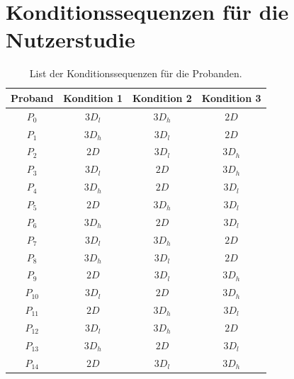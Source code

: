 \chapter{Konditionssequenzen für die Nutzerstudie}
\begin{table}[h]
    \centering
    \caption{List der Konditionssequenzen für die Probanden.}
    \label{appendix:condition_sequences}
    \begin{tabular}{cccc}\toprule
        Proband & Kondition 1 & Kondition 2 & Kondition 3 \\\midrule
        $P_0$ & $3D_l$ & $3D_h$ & $2D$ \\
        $P_1$ & $3D_h$ & $3D_l$ & $2D$ \\
        $P_2$ & $2D$ & $3D_l$ & $3D_h$ \\
        $P_3$ & $3D_l$ & $2D$ & $3D_h$ \\
        $P_4$ & $3D_h$ & $2D$ & $3D_l$ \\
        $P_5$ & $2D$ & $3D_h$ & $3D_l$ \\
        $P_6$ & $3D_h$ & $2D$ & $3D_l$ \\
        $P_7$ & $3D_l$ & $3D_h$ & $2D$ \\
        $P_8$ & $3D_h$ & $3D_l$ & $2D$ \\
        $P_9$ & $2D$ & $3D_l$ & $3D_h$ \\
        $P_{10}$ & $3D_l$ & $2D$ & $3D_h$ \\
        $P_{11}$ & $2D$ & $3D_h$ & $3D_l$ \\
        $P_{12}$ & $3D_l$ & $3D_h$ & $2D$ \\
        $P_{13}$ & $3D_h$ & $2D$ & $3D_l$ \\
        $P_{14}$ & $2D$ & $3D_l$ & $3D_h$ \\\bottomrule        
    \end{tabular}
\end{table}